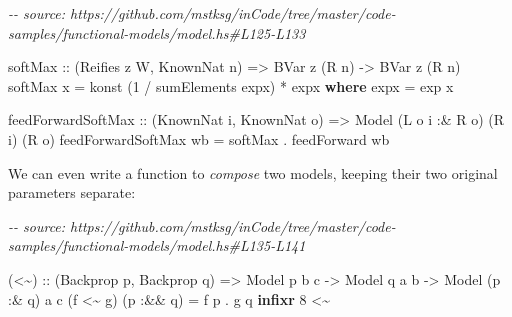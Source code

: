 \documentclass[]{article}
\newenvironment{Shaded}{}{}
\newcommand{\CommentTok}[1]{\textcolor[rgb]{0.38,0.63,0.69}{\textit{#1}}}
\newcommand{\DataTypeTok}[1]{\textcolor[rgb]{0.56,0.13,0.00}{#1}}
\newcommand{\DecValTok}[1]{\textcolor[rgb]{0.25,0.63,0.44}{#1}}
\newcommand{\FunctionTok}[1]{\textcolor[rgb]{0.02,0.16,0.49}{#1}}
\newcommand{\KeywordTok}[1]{\textcolor[rgb]{0.00,0.44,0.13}{\textbf{#1}}}
\newcommand{\NormalTok}[1]{#1}
\newcommand{\OperatorTok}[1]{\textcolor[rgb]{0.40,0.40,0.40}{#1}}
\newcommand{\OtherTok}[1]{\textcolor[rgb]{0.00,0.44,0.13}{#1}}
\begin{document}
\begin{Shaded}
\begin{Highlighting}[]
\CommentTok{{-}{-} source: https://github.com/mstksg/inCode/tree/master/code{-}samples/functional{-}models/model.hs\#L125{-}L133}

\OtherTok{softMax ::}\NormalTok{ (}\DataTypeTok{Reifies}\NormalTok{ z }\DataTypeTok{W}\NormalTok{, }\DataTypeTok{KnownNat}\NormalTok{ n) }\OtherTok{=\textgreater{}} \DataTypeTok{BVar}\NormalTok{ z (}\DataTypeTok{R}\NormalTok{ n) }\OtherTok{{-}\textgreater{}} \DataTypeTok{BVar}\NormalTok{ z (}\DataTypeTok{R}\NormalTok{ n)}
\NormalTok{softMax x }\OtherTok{=}\NormalTok{ konst (}\DecValTok{1} \OperatorTok{/}\NormalTok{ sumElements expx) }\OperatorTok{*}\NormalTok{ expx}
  \KeywordTok{where}
\NormalTok{    expx }\OtherTok{=} \FunctionTok{exp}\NormalTok{ x}

\NormalTok{feedForwardSoftMax}
\OtherTok{    ::}\NormalTok{ (}\DataTypeTok{KnownNat}\NormalTok{ i, }\DataTypeTok{KnownNat}\NormalTok{ o)}
    \OtherTok{=\textgreater{}} \DataTypeTok{Model}\NormalTok{ (}\DataTypeTok{L}\NormalTok{ o i }\OperatorTok{:\&} \DataTypeTok{R}\NormalTok{ o) (}\DataTypeTok{R}\NormalTok{ i) (}\DataTypeTok{R}\NormalTok{ o)}
\NormalTok{feedForwardSoftMax wb }\OtherTok{=}\NormalTok{ softMax }\OperatorTok{.}\NormalTok{ feedForward wb}
\end{Highlighting}
\end{Shaded}

We can even write a function to \emph{compose} two models, keeping their two
original parameters separate:

\begin{Shaded}
\begin{Highlighting}[]
\CommentTok{{-}{-} source: https://github.com/mstksg/inCode/tree/master/code{-}samples/functional{-}models/model.hs\#L135{-}L141}

\NormalTok{(}\OperatorTok{\textless{}\textasciitilde{}}\NormalTok{)}
\OtherTok{    ::}\NormalTok{ (}\DataTypeTok{Backprop}\NormalTok{ p, }\DataTypeTok{Backprop}\NormalTok{ q)}
    \OtherTok{=\textgreater{}} \DataTypeTok{Model}\NormalTok{  p       b c}
    \OtherTok{{-}\textgreater{}} \DataTypeTok{Model}\NormalTok{       q  a b}
    \OtherTok{{-}\textgreater{}} \DataTypeTok{Model}\NormalTok{ (p }\OperatorTok{:\&}\NormalTok{ q) a c}
\NormalTok{(f }\OperatorTok{\textless{}\textasciitilde{}}\NormalTok{ g) (p }\OperatorTok{:\&\&}\NormalTok{ q) }\OtherTok{=}\NormalTok{ f p }\OperatorTok{.}\NormalTok{ g q}
\KeywordTok{infixr} \DecValTok{8} \OperatorTok{\textless{}\textasciitilde{}}
\end{Highlighting}
\end{Shaded}
\end{document}

